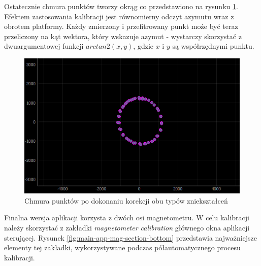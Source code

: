 
Ostatecznie chmura punktów tworzy okrąg co przedstawiono na rysunku \ref{fig:2d-mag-soft-corr-applied}. Efektem zastosowania kalibracji jest równomierny odczyt azymutu wraz z obrotem platformy. Każdy zmierzony i przefitrowany punkt może być teraz przeliczony na kąt wektora, który wskazuje azymut - wystarczy skorzystać z dwuargumentowej funkcji $arctan2(x,y)$, gdzie $x$ i $y$ są współrzędnymi punktu.

\begin{figure}[ht]
	\centering
		\includegraphics[width=0.6\linewidth]{rys/ScanBot-11-2d-set-theta-then-sigma-and-done.PNG}
	\caption{Chmura punktów po dokonaniu korekcji obu typów zniekształceń}
	\label{fig:2d-mag-soft-corr-applied}
\end{figure}

Finalna wersja aplikacji korzysta z dwóch osi magnetometru. W celu kalibracji należy skorzystać z zakładki \emph{magnetometer calibration} głównego okna aplikacji sterującej. Rysunek \ref{fig:main-app-mag-section-bottom} przedstawia najważniejsze elementy tej zakładki, wykorzystywane podczas półautomatycznego procesu kalibracji.

